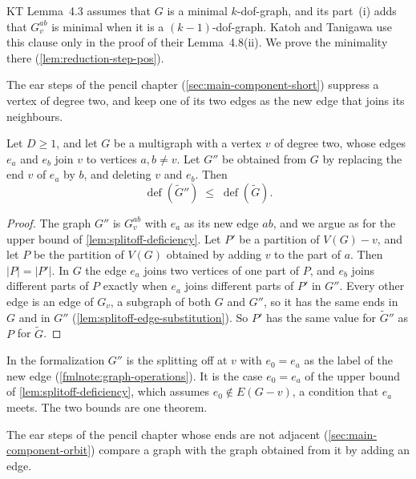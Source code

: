 KT Lemma~4.3 assumes that $G$ is a minimal $k$-dof-graph, and its
part~(i) adds that $G_v^{ab}$ is minimal when it is a
$(k-1)$-dof-graph. Katoh and Tanigawa use this clause only in the proof
of their Lemma~4.8(ii). We prove the minimality there
(\cref{lem:reduction-step-pos}).

The ear steps of the pencil chapter (\cref{sec:main-component-short})
suppress a vertex of degree two, and keep one of its two edges as the
new edge that joins its neighbours.

\begin{lemma}
  \label{lem:splitoff-deficiency-reuse}
  \leanok
  Let $D \ge 1$, and let $G$ be a multigraph with a vertex $v$ of degree
  two, whose edges $e_a$ and $e_b$ join $v$ to vertices $a, b \neq v$.
  Let $G''$ be obtained from $G$ by replacing the end $v$ of $e_a$ by
  $b$, and deleting $v$ and $e_b$. Then
  \[
    \operatorname{def}(\tilde G'') \;\le\; \operatorname{def}(\tilde G).
  \]
\end{lemma}
\begin{proof}
  \leanok
  The graph $G''$ is $G_v^{ab}$ with $e_a$ as its new edge $ab$, and we
  argue as for the upper bound of \cref{lem:splitoff-deficiency}. Let
  $P'$ be a partition of $V(G) - v$, and let $P$ be the partition of
  $V(G)$ obtained by adding $v$ to the part of $a$. Then $|P| = |P'|$. In
  $G$ the edge $e_a$ joins two vertices of one part of $P$, and $e_b$
  joins different parts of $P$ exactly when $e_a$ joins different parts
  of $P'$ in $G''$. Every other edge is an edge of $G_v$, a subgraph of
  both $G$ and $G''$, so it has the same ends in $G$ and in $G''$
  (\cref{lem:splitoff-edge-substitution}). So $P'$ has the same value
  for $\tilde G''$ as $P$ for $\tilde G$.
\end{proof}
\begin{fmlnote}
  In the formalization $G''$ is the splitting off at $v$ with $e_0 = e_a$
  as the label of the new edge (\cref{fmlnote:graph-operations}). It is the
  case $e_0 = e_a$ of the upper bound of \cref{lem:splitoff-deficiency},
  which assumes $e_0 \notin E(G - v)$, a condition that $e_a$ meets. The
  two bounds are one theorem.
\end{fmlnote}

The ear steps of the pencil chapter whose ends are not adjacent
(\cref{sec:main-component-orbit}) compare a graph with the graph
obtained from it by adding an edge.


